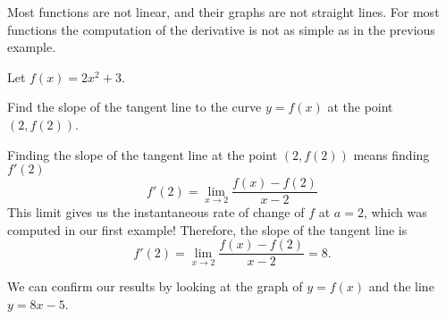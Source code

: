 \documentclass{ximera}
\begin{document}
Most functions are not linear, and their graphs are not straight lines.  For most functions the computation of the derivative is not as 
simple as in the previous example.
\begin{example}
	Let $f(x) = 2x^2+3$.
	
	Find the slope of the tangent line to the curve $y=f(x)$ at the point $(2,f(2))$.
	\begin{explanation}
		Finding the slope of the tangent line at the point $(2,f(2))$ means finding $f'(2)$
		\[ f'(2) = \lim_{x\to 2} \frac{f(x) - f(2)}{x-2}\]
		This limit gives us the instantaneous rate of change of $f$ at $a=2$, which was computed in our first example!
		Therefore,	 the slope of the tangent line is 
		\[ f'(2) = \lim_{x\to 2} \frac{f(x) - f(2)}{x-2}=8. \]
	\end{explanation}
	\begin{onlineOnly}
 		 We can confirm our results by looking at the graph of $y=f(x)$ and the line $y=8x-5$. 
		 \begin{image}\end{image}
	  \end{onlineOnly}
\end{example}
\end{document}
